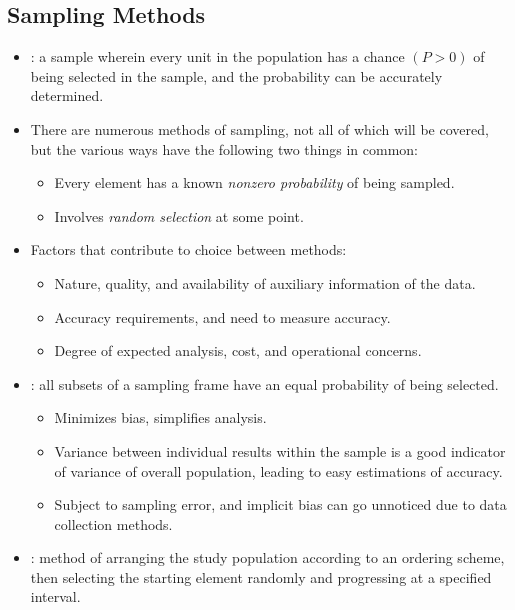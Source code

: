 \begin{itemize}
  \subsection{Sampling Methods}
  \begin{itemize}
    \item {}: a sample wherein every unit in the population has a chance \((P > 0)\) of being selected in the sample, and the probability can be accurately determined.
    \item There are numerous methods of sampling, not all of which will be covered, but the various ways have the following two things in common: 
      \begin{itemize}
        \item Every element has a known \emph{nonzero probability} of being sampled.
        \item Involves \emph{random selection} at some point.
      \end{itemize}
    \item Factors that contribute to choice between methods:
      \begin{itemize}
        \item Nature, quality, and availability of auxiliary information of the data.
        \item Accuracy requirements, and need to measure accuracy.
        \item Degree of expected analysis, cost, and operational concerns.
      \end{itemize}
    \item {}: all subsets of a sampling frame have an equal probability of being selected.
      \begin{itemize}
        \item Minimizes bias, simplifies analysis.
        \item Variance between individual results within the sample is a good indicator of variance of overall population, leading to easy estimations of accuracy.
        \item Subject to sampling error, and implicit bias can go unnoticed due to data collection methods.
      \end{itemize}
    \item {}: method of arranging the study population according to an ordering scheme, then selecting the starting element randomly and progressing at a specified interval.
      \begin{itemize}

\end{itemize}
\end{itemize}
\end{itemize}
